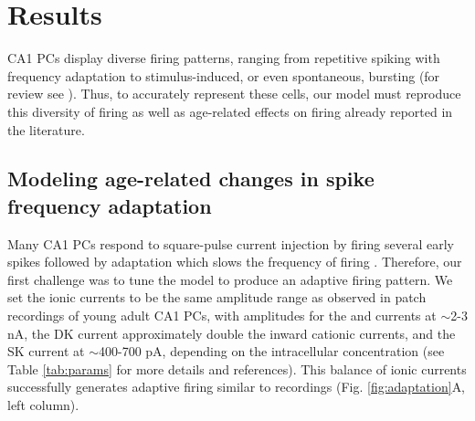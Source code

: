 \documentclass[12pt]{article}
\begin{document}
\section{Results}
CA1 PCs display diverse firing patterns, ranging from repetitive spiking with frequency adaptation to stimulus-induced, or even spontaneous, bursting (for review see \cite{mckiernan2017ca1}). Thus, to accurately represent these cells, our model must reproduce this diversity of firing as well as age-related effects on firing already reported in the literature.  

\subsection{Modeling age-related changes in spike frequency adaptation}
\label{sec:adaptation}

Many CA1 PCs respond to square-pulse current injection by firing several early spikes followed by adaptation which slows the frequency of firing \citep{gant2006early,madison1984control,stackman2002small,borde1995activity,gu2008sk,jung2009biphasic,kim2005kv4,malik2012enhanced}. 
Therefore, our first challenge was to tune the model to produce an adaptive firing pattern. 
We set the ionic currents to be the same amplitude range as observed in patch recordings of young adult CA1 PCs, with amplitudes for the {\Na} and {\Ca} currents at $\sim$2-3 nA, the DK current approximately double the inward cationic currents, and the SK current at $\sim$400-700 pA, depending on the intracellular {\Ca} concentration (see Table \ref{tab:params} for more details and references). This balance of ionic currents successfully generates adaptive firing similar to recordings (Fig. \ref{fig:adaptation}A, left column).
\end{document}
